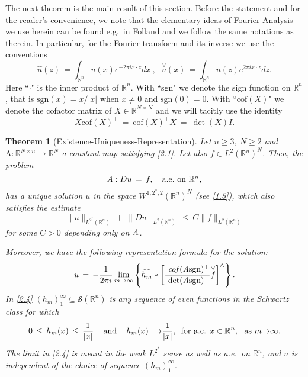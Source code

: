 \documentclass{amsart}
\newtheorem{theorem}{Theorem}
\theoremstyle{definition}
\numberwithin{equation}{section}
\begin{document}
The next theorem is the main result of this section. Before the statement and for the reader's convenience, we note that the elementary ideas of Fourier Analysis we use herein can be found e.g.\ in Folland \cite{F} and we follow the same notations as therein. In particular, for the Fourier transform and its inverse we use the conventions
\[
\widehat{u}(z)\,= \int_{{\mathbb{R}}^n}u(x)e^{-2\pi i x\cdot z}dx\ , \ \ \ \overset{\vee}{u}(x)\,= \int_{{\mathbb{R}}^n}u(z)e^{2\pi i x\cdot z}dz.
\]
Here ``$\cdot$" is the inner product of ${\mathbb{R}}^n$. With ``sgn" we denote the sign function on ${\mathbb{R}}^n$, that is ${\textrm{sgn}}(x)=x/|x|$ when $x\neq 0$ and ${\textrm{sgn}}(0)=0$. With ``${\textrm{cof}}(X)$" we denote the cofactor matrix of $X \in {\mathbb{R}}^{N {\times} N}$ and we will tacitly use the identity
\[
X{\textrm{cof}}(X)^\top \ =\ {\textrm{cof}}(X)^\top X \ = \ \det(X)I. 
\]

\begin{theorem}[Existence-Uniqueness-Representation] \label{th1} Let $n\geq 3$, $N\geq 2$ and ${\textrm{A}} : {\mathbb{R}}^{N {\times} n}{\longrightarrow} {\mathbb{R}}^N$ a constant map satisfying \eqref{2.1}. Let also $f\in L^2({\mathbb{R}}^n)^N$. Then, the problem
\[
\emph{\textrm{A}} : Du \,=\, f, \ \ \text{ a.e.\ on }{\mathbb{R}}^n,
\]
has a unique solution $u$ in the space $W^{1;2^*\!,2}({\mathbb{R}}^n)^N$ (see \eqref{1.5}), which also satisfies the estimate
\begin{equation} \label{2.3}
\|u\|_{L^{2^*}({\mathbb{R}}^n)}\, + \ \|Du\|_{L^{2}({\mathbb{R}}^n)}\, \leq\, C \|f\|_{L^{2}({\mathbb{R}}^n)}
\end{equation}
for some $C>0$ depending only on $\emph{\textrm{A}}$. 

Moreover, we have the following representation formula for the solution:
\begin{equation} \label{2.4}
u\, =\, -\frac{1}{2\pi i} \lim_{m{\rightarrow} \infty}
\left\{  \widehat{h_m} \ast
\left[ 
\frac{\  \emph{\textrm{cof}} \,(\emph{\textrm{A}} {\textrm{sgn}} )^\top}{ \det (\emph{\textrm{A}} {\textrm{sgn}}) \ } \overset{\vee}{f}
\right]^{\wedge} 
\right\}.
\end{equation}
In \eqref{2.4} $(h_m)^\infty_1 {\subseteq} {\mathcal{S}}({\mathbb{R}}^n)$ is any sequence of even functions in the Schwartz class for which 
\[
\text{$0\, \leq\, h_m(x) \,\leq\, \frac{1}{|x|}$ \ \, and \, \ $h_m(x) {\longrightarrow} \frac{1}{|x|}$, \ for a.e. $x\in {\mathbb{R}}^n$,\ \,  as $m{\rightarrow} \infty$.} 
\]
The limit in \eqref{2.4} is meant in the weak $L^{2^*}$ sense as well as a.e.\ on ${\mathbb{R}}^n$, and $u$ is independent of the choice of sequence $(h_m)^\infty_1 $.

\end{theorem}
\end{document}
